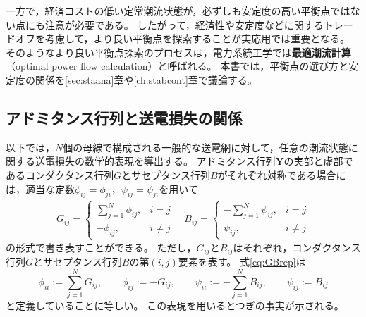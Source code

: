 \documentclass[tombow,dvipdfmx]{corona-a5-1.1}
\begin{document}
一方で，経済コストの低い定常潮流状態が，必ずしも安定度の高い平衡点ではない点にも注意が必要である。
したがって，経済性や安定度などに関するトレードオフを考慮して，より良い平衡点を探索することが実応用では重要となる。
そのようなより良い平衡点探索のプロセスは，電力系統工学では\textbf{最適潮流計算}（optimal power flow calculation）と呼ばれる。
本書では，平衡点の選び方と安定度の関係を\ref{sec:staana}章や\ref{ch:stabcont}章で議論する。

\subsection{アドミタンス行列と送電損失の関係\advanced}

以下では，$N$個の母線で構成される一般的な送電網に対して，任意の潮流状態に関する送電損失の数学的表現を導出する。
アドミタンス行列$\bm{Y}$の実部と虚部であるコンダクタンス行列$G$とサセプタンス行列$B$がそれぞれ対称である場合には，適当な定数$\phi_{ij}=\phi_{ji}$，$\psi_{ij}=\psi_{ji}$を用いて
\begin{align}\label{eq:GBrep}
G_{ij} =
\left\{
\begin{array}{cl}
\textstyle \sum_{j=1}^{N} \phi_{ij}, & i=j \\
-\phi_{ij}, & i\neq j 
\end{array}
\right.
\quad
B_{ij}  =
\left\{
\begin{array}{cl}
\textstyle - \sum_{j=1}^{N} \psi_{ij}, & i=j \\
\psi_{ij}, & i\neq j 
\end{array}
\right.
\end{align}
の形式で書き表すことができる。
ただし，$G_{ij}$と$B_{ij}$はそれぞれ，コンダクタンス行列$G$とサセプタンス行列$B$の第$(i,j)$要素を表す。
式\ref{eq:GBrep}は
\[
\phi_{ii}:= \sum_{j=1}^N G_{ij},\qquad
\phi_{ij}:=-G_{ij},\qquad 
\psi_{ii}:= - \sum_{j=1}^N B_{ij},\qquad 
\psi_{ij}:=B_{ij}
\]
と定義していることに等しい。
この表現を用いるとつぎの事実が示される。
\end{document}
